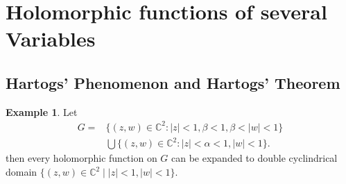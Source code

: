 \documentclass[12pt,twoside]{book}
\theoremstyle{plain}
\theoremstyle{definition}
\newtheorem{example}[example]{Example}
\theoremstyle{remark}
\numberwithin{equation}{section}
\begin{document}
\section{\bf Holomorphic functions of several Variables}
\subsection{Hartogs' Phenomenon and Hartogs' Theorem}
\begin{example}
Let 
\begin{align*}
G =&\{(z,w)\in \mathbb{C}^2 : |z|<1,\beta<1,\beta <|w|<1\}\\
&\bigcup \{(z,w)\in\mathbb{C}^2 : |z|<\alpha<1,|w|<1\}.
\end{align*}
then every holomorphic function on $G$ can be expanded to double cyclindrical domain $\{(z,w)\in \mathbb{C}^2 \mid  |z|<1,|w|<1\}$.
\end{example}
\end{document}
